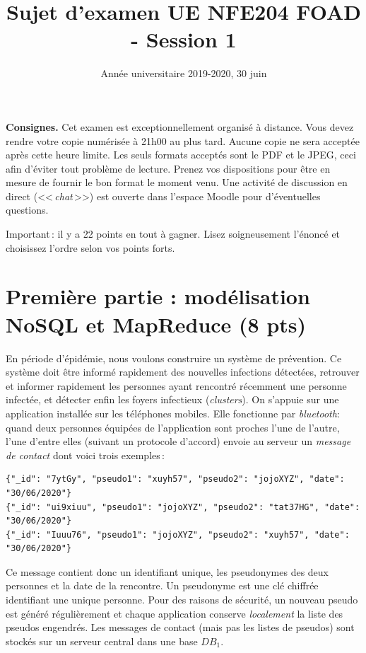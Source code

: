 \documentclass[11pt,a4paper]{article}
\newcommand{\guill}[1]{<<\,#1\,>>}
\begin{document}
\title{Sujet d'examen UE NFE204 FOAD - Session 1}
\author{Année universitaire 2019-2020, 30 juin}
\date{\empty}

\maketitle

{\bf \Large Consignes.}
Cet examen est exceptionnellement organisé à distance. 
Vous devez rendre votre copie numérisée à 21h00 au plus tard. 
Aucune copie ne sera acceptée après cette heure limite. 
Les seuls formats acceptés sont le PDF et le JPEG, ceci afin d'éviter tout problème de lecture.  
Prenez vos dispositions pour être en mesure de fournir le bon format le moment venu. Une activité 
de discussion en direct (\guill{\textit{chat}}) est ouverte dans l'espace Moodle pour d'éventuelles questions.

Important\,: il y a 22 points en tout à gagner. Lisez soigneusement l'énoncé et choisissez 
l'ordre selon vos points forts.

\section{Première partie : modélisation NoSQL et MapReduce (8 pts)}

En période d'épidémie, nous voulons construire un système de prévention. Ce système
doit être informé rapidement des nouvelles infections détectées, retrouver 
et informer rapidement les personnes ayant rencontré récemment une personne
infectée, et détecter enfin les foyers infectieux (\textit{clusters}). 
On s'appuie sur une application installée sur les téléphones mobiles. Elle fonctionne
par \textit{bluetooth}: quand deux personnes équipées de l'application sont proches 
l'une de l'autre, l'une d'entre elles (suivant un protocole d'accord)
 envoie au serveur un \emph{message 
de contact} dont voici  trois exemples\,:

\begin{small}
\begin{verbatim}
{"_id": "7ytGy", "pseudo1": "xuyh57", "pseudo2": "jojoXYZ", "date": "30/06/2020"}
{"_id": "ui9xiuu", "pseudo1": "jojoXYZ", "pseudo2": "tat37HG", "date": "30/06/2020"}
{"_id": "Iuuu76", "pseudo1": "jojoXYZ", "pseudo2": "xuyh57", "date": "30/06/2020"}
\end{verbatim}
\end{small}

Ce message contient donc un identifiant unique, les pseudonymes
des deux personnes et la date de la rencontre. Un pseudonyme
est une clé chiffrée identifiant une unique personne. Pour des raisons
de sécurité, un nouveau pseudo est généré régulièrement et chaque application
conserve \emph{localement} la liste des pseudos engendrés. 
Les messages de contact (mais pas les listes de pseudos) sont stockés sur un serveur central
dans une base $DB_1$.
\vspace*{0.2cm}
\end{document}
